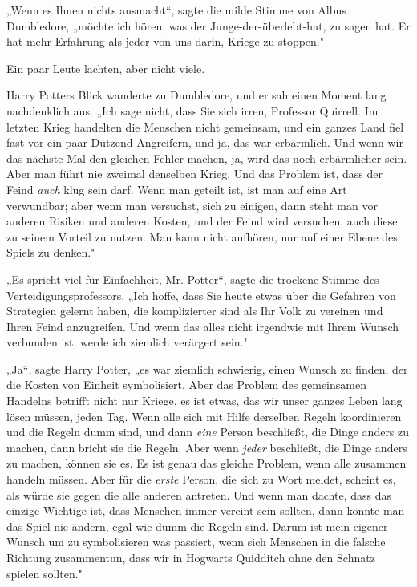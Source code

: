 {„Wenn es Ihnen nichts ausmacht“, sagte die milde Stimme von Albus Dumbledore, „möchte ich hören, was der Junge-der-überlebt-hat, zu sagen hat. Er hat mehr Erfahrung als jeder von uns darin, Kriege zu stoppen."

Ein paar Leute lachten, aber nicht viele.

Harry Potters Blick wanderte zu Dumbledore, und er sah einen Moment lang nachdenklich aus. „Ich sage nicht, dass Sie sich irren, Professor Quirrell. Im letzten Krieg handelten die Menschen nicht gemeinsam, und ein ganzes Land fiel fast vor ein paar Dutzend Angreifern, und ja, das war erbärmlich. Und wenn wir das nächste Mal den gleichen Fehler machen, ja, wird das noch erbärmlicher sein. Aber man führt nie zweimal denselben Krieg. Und das Problem ist, dass der Feind \emph{auch} klug sein darf. Wenn man geteilt ist, ist man auf eine Art verwundbar; aber wenn man versuchst, sich zu einigen, dann steht man vor anderen Risiken und anderen Kosten, und der Feind wird versuchen, auch diese zu seinem Vorteil zu nutzen. Man kann nicht aufhören, nur auf einer Ebene des Spiels zu denken."

„Es spricht viel für Einfachheit, Mr. Potter“, sagte die trockene Stimme des Verteidigungsprofessors. „Ich hoffe, dass Sie heute etwas über die Gefahren von Strategien gelernt haben, die komplizierter sind als Ihr Volk zu vereinen und Ihren Feind anzugreifen. Und wenn das alles nicht irgendwie mit Ihrem Wunsch verbunden ist, werde ich ziemlich verärgert sein."

„Ja“, sagte Harry Potter, „es war ziemlich schwierig, einen Wunsch zu finden, der die Kosten von Einheit symbolisiert. Aber das Problem des gemeinsamen Handelns betrifft nicht nur Kriege, es ist etwas, das wir unser ganzes Leben lang lösen müssen, jeden Tag. Wenn alle sich mit Hilfe derselben Regeln koordinieren und die Regeln dumm sind, und dann \emph{eine} Person beschließt, die Dinge anders zu machen, dann bricht sie die Regeln. Aber wenn \emph{jeder} beschließt, die Dinge anders zu machen, können sie es. Es ist genau das gleiche Problem, wenn alle zusammen handeln müssen. Aber für die \emph{erste} Person, die sich zu Wort meldet, scheint es, als würde sie gegen die alle anderen antreten. Und wenn man dachte, dass das einzige Wichtige ist, dass Menschen immer vereint sein sollten, dann könnte man das Spiel nie ändern, egal wie dumm die Regeln sind. Darum ist mein eigener Wunsch um zu symbolisieren was passiert, wenn sich Menschen in die falsche Richtung zusammentun, dass wir in Hogwarts Quidditch ohne den Schnatz spielen sollten."

}
